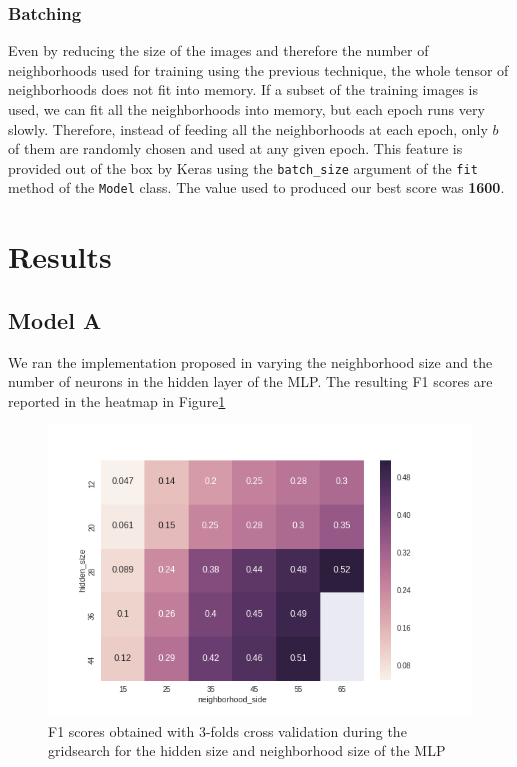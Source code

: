 \documentclass[10pt,conference,compsocconf]{IEEEtran}
\begin{document}
\subsubsection{Batching}
Even by reducing the size of the images and therefore the number of neighborhoods used for training using the previous technique, the whole tensor of neighborhoods does not fit into memory. If a subset of the training images is used, we can fit all the neighborhoods into memory, but each epoch runs very slowly. Therefore, instead of feeding all the neighborhoods at each epoch, only $b$ of them are randomly chosen and used at any given epoch. This feature is provided out of the box by Keras using the \texttt{batch\_size} argument of the \texttt{fit} method of the \texttt{Model} class. The value used to produced our best score was \textbf{1600}.

\section{Results} \label{results}
\subsection{Model A}
We ran the implementation proposed in \cite{model1} varying the neighborhood size and the number of neurons in the hidden layer of the MLP. The resulting F1 scores are reported in the heatmap in Figure\ref{fig:heatmap}
\begin{figure}[h]
  \centering
  \includegraphics[width=\columnwidth]{mlp_gridsearch.png}
  \caption{F1 scores obtained with 3-folds cross validation during the gridsearch for the hidden size and neighborhood size of the MLP}
  \vspace{-3mm}
  \label{fig:heatmap}
\end{figure}
\end{document}
